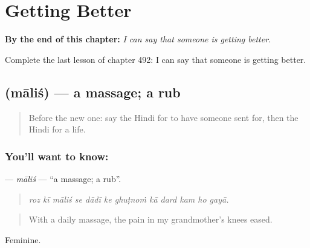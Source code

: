 
\chapter{Getting Better}
\label{ch:hi-getting-better}

\begin{chapteropening}
\textbf{By the end of this chapter:} \emph{I can say that someone is getting better.}

Complete the last lesson of chapter 492: I can say that someone is getting better.
\end{chapteropening}

\section[\texorpdfstring{\hi{मालिश} (māliś)}{मालिश (māliś)}]{ (māliś) — a massage; a rub}

\label{lesson:HI-C492-malis}



\begin{quote}
Before the new one: say the Hindi for to have someone sent for, then the Hindi for a life.
\end{quote}

\subsection*{You'll want to know: }
\textbf{} — \emph{māliś} — \textquotedblleft{}a massage; a rub\textquotedblright{}.

\begin{quote}
           
\end{quote}

\begin{quote}
\emph{roz kī māliś se dādī ke ghuṭnoṁ kā dard kam ho gayā.}
\end{quote}

\begin{quote}
With a daily massage, the pain in my grandmother's knees eased.
\end{quote}

Feminine.

